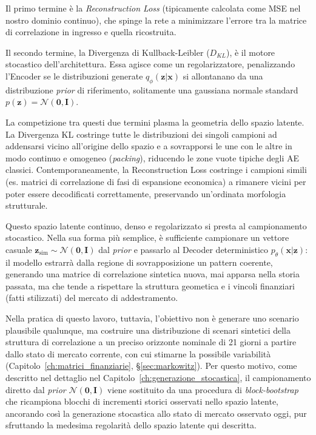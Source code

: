 Il primo termine è la \emph{Reconstruction Loss} (tipicamente calcolata come MSE nel nostro dominio continuo), che spinge la rete a minimizzare l'errore tra la matrice di correlazione in ingresso e quella ricostruita. 

Il secondo termine, la Divergenza di Kullback-Leibler ($D_{KL}$), è il motore stocastico dell'architettura. Essa agisce come un regolarizzatore, penalizzando l'Encoder se le distribuzioni generate $q_{\phi}(\mathbf{z}|\mathbf{x})$ si allontanano da una distribuzione \emph{prior} di riferimento, solitamente una gaussiana normale standard $p(\mathbf{z}) = \mathcal{N}(\mathbf{0}, \mathbf{I})$.

La competizione tra questi due termini plasma la geometria dello spazio latente. La Divergenza KL costringe tutte le distribuzioni dei singoli campioni ad addensarsi vicino all'origine dello spazio e a sovrapporsi le une con le altre in modo continuo e omogeneo (\emph{packing}), riducendo le zone vuote tipiche degli AE classici. Contemporaneamente, la Reconstruction Loss costringe i campioni simili (es. matrici di correlazione di fasi di espansione economica) a rimanere vicini per poter essere decodificati correttamente, preservando un'ordinata morfologia strutturale.

Questo spazio latente continuo, denso e regolarizzato si presta al campionamento stocastico. Nella sua forma più semplice, è sufficiente campionare un vettore casuale $\mathbf{z}_{\text{sim}} \sim \mathcal{N}(\mathbf{0}, \mathbf{I})$ dal \emph{prior} e passarlo al Decoder deterministico $p_{\theta}(\mathbf{x}|\mathbf{z})$: il modello estrarrà dalla regione di sovrapposizione un pattern coerente, generando una matrice di correlazione sintetica nuova, mai apparsa nella storia passata, ma che tende a rispettare la struttura geometica e i vincoli finanziari (fatti stilizzati) del mercato di addestramento.

Nella pratica di questo lavoro, tuttavia, l'obiettivo non è generare uno scenario plausibile qualunque, ma costruire una distribuzione di scenari sintetici della struttura di correlazione a un preciso orizzonte nominale di 21 giorni a partire dallo stato di mercato corrente, con cui stimarne la possibile variabilità (Capitolo~\ref{ch:matrici_finanziarie}, \S\ref{sec:markowitz}). Per questo motivo, come descritto nel dettaglio nel Capitolo~\ref{ch:generazione_stocastica}, il campionamento diretto dal \emph{prior} $\mathcal{N}(\mathbf{0}, \mathbf{I})$ viene sostituito da una procedura di \emph{block-bootstrap} che ricampiona blocchi di incrementi storici osservati nello spazio latente, ancorando così la generazione stocastica allo stato di mercato osservato oggi, pur sfruttando la medesima regolarità dello spazio latente qui descritta.
